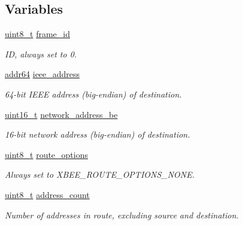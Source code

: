 \subsection*{Variables}
\begin{DoxyCompactItemize}
\item 
\mbox{\label{group__xbee__route_ga03c1016ac46b9df250b994f242cf956a}} 
\hyperlink{group__hal__dos_gae1affc9ca37cfb624959c866a73f83c2}{uint8\+\_\+t} \hyperlink{group__xbee__route_ga03c1016ac46b9df250b994f242cf956a}{frame\+\_\+id}
\begin{DoxyCompactList}\small\item\em ID, always set to 0. \end{DoxyCompactList}\item 
\hyperlink{unionaddr64}{addr64} \hyperlink{group__xbee__route_ga2549f921e25a72dfa05a2154a792e2bf}{ieee\+\_\+address}
\begin{DoxyCompactList}\small\item\em 64-\/bit I\+E\+EE address (big-\/endian) of destination. \end{DoxyCompactList}\item 
\hyperlink{group__hal__dos_ga5a8b2dc9e45a9ee81a94ef304fb62505}{uint16\+\_\+t} \hyperlink{group__xbee__route_ga73d48563eb05cd5fcc4add79d226a3b8}{network\+\_\+address\+\_\+be}
\begin{DoxyCompactList}\small\item\em 16-\/bit network address (big-\/endian) of destination. \end{DoxyCompactList}\item 
\mbox{\label{group__xbee__route_gad1af5d8a8f1c2531c591cc5fdd7bff8d}} 
\hyperlink{group__hal__dos_gae1affc9ca37cfb624959c866a73f83c2}{uint8\+\_\+t} \hyperlink{group__xbee__route_gad1af5d8a8f1c2531c591cc5fdd7bff8d}{route\+\_\+options}
\begin{DoxyCompactList}\small\item\em Always set to X\+B\+E\+E\+\_\+\+R\+O\+U\+T\+E\+\_\+\+O\+P\+T\+I\+O\+N\+S\+\_\+\+N\+O\+NE. \end{DoxyCompactList}\item 
\hyperlink{group__hal__dos_gae1affc9ca37cfb624959c866a73f83c2}{uint8\+\_\+t} \hyperlink{group__xbee__route_ga568b7e68dfcb5aabdbcf38de26f1b63d}{address\+\_\+count}
\begin{DoxyCompactList}\small\item\em Number of addresses in route, excluding source and destination. \end{DoxyCompactList}\item 

\end{DoxyCompactItemize}
